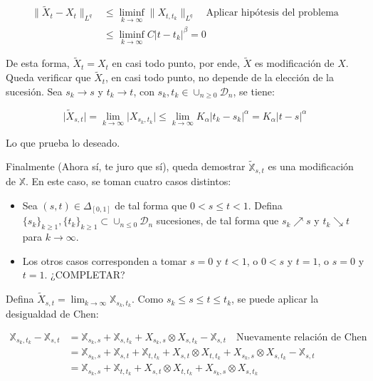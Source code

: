 \begin{align*}
	\lVert \tilde{X}_t - X_t \rVert_{L^q} &\leq \liminf_{k\rightarrow \infty} \lVert X_{t, t_k}\rVert_{L^q} \quad \text{Aplicar hipótesis del problema} \\
	&\leq \liminf_{k\rightarrow \infty} C \lvert t - t_k \rvert^{\beta} = 0
\end{align*}

De esta forma, $\tilde{X}_t = X_t$ en casi todo punto, por ende, $\tilde{X}$ es modificación de $X$. Queda verificar que $\tilde{X}_t$, en casi todo punto, no depende de la elección de la sucesión. Sea $s_k \rightarrow s$ y $t_k \rightarrow t$, con $s_k, t_k \in \cup_{n \geq 0} \mathcal{D}_n$, se tiene:

\[
	\lvert \tilde{X}_{s,t} \rvert = \lim_{k \rightarrow \infty} \lvert X_{s_k, t_k} \rvert \leq \lim_{k \rightarrow \infty} K_{\alpha} \lvert t_k - s_k \rvert^{\alpha} = K_{\alpha} \lvert t - s \rvert^{\alpha}
\]

Lo que prueba lo deseado.

Finalmente (Ahora sí, te juro que sí), queda demostrar $\tilde{\mathbb{X}}_{s,t}$ es una modificación de $\mathbb{X}$. En este caso, se toman cuatro casos distintos:

\begin{itemize}

	\item Sea $(s,t) \in \Delta_{[0,1]}$ de tal forma que $0 < s \leq t < 1$. Defina $\{ s_k \}_{k \geq 1}, \{ t_k \}_{k \geq 1} \subset \cup_{n \leq 0} \mathcal{D}_n$ sucesiones, de tal forma que $s_k \nearrow s$ y $t_k \searrow t$ para $k \rightarrow \infty$. 

	\item Los otros casos corresponden a tomar $s = 0$ y $t < 1$, o $0 < s$ y $t = 1$, o $s = 0$ y $t = 1$. ¿COMPLETAR?

\end{itemize}

Defina $\tilde{X}_{s,t} = \lim_{k \rightarrow \infty} \mathbb{X}_{s_k, t_k}$. Como $s_k \leq s \leq t \leq t_k$, se puede aplicar la desigualdad de Chen:

	\begin{align*}
		\mathbb{X}_{s_k, t_k} - \mathbb{X}_{s,t} &= \mathbb{X}_{s_k, s} + \mathbb{X}_{s, t_k} + X_{s_k, s} \otimes X_{s, t_k} - \mathbb{X}_{s, t} \quad \text{Nuevamente relación de Chen} \\
		&= \mathbb{X}_{s_k, s} + \mathbb{X}_{s, t} + \mathbb{X}_{t, t_k} + X_{s, t} \otimes X_{t, t_k} + X_{s_k, s} \otimes X_{s, t_k} - \mathbb{X}_{s, t} \\
		&= \mathbb{X}_{s_k, s} + \mathbb{X}_{t, t_k} + X_{s, t} \otimes X_{t, t_k} + X_{s_k, s} \otimes X_{s, t_k}
	\end{align*}

